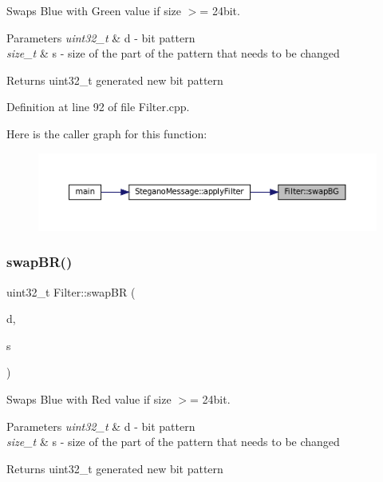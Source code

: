 Swaps Blue with Green value if size $>$= 24bit. 


\begin{DoxyParams}{Parameters}
{\em uint32\+\_\+t} & d -\/ bit pattern \\
\hline
{\em size\+\_\+t} & s -\/ size of the part of the pattern that needs to be changed \\
\hline
\end{DoxyParams}
\begin{DoxyReturn}{Returns}
uint32\+\_\+t generated new bit pattern 
\end{DoxyReturn}


Definition at line 92 of file Filter.\+cpp.

Here is the caller graph for this function\+:
\nopagebreak
\begin{figure}[H]
\begin{center}
\leavevmode
\includegraphics[width=350pt]{classFilter_a68528a62dfbd9f78d6bd0703ca5bd828_icgraph}
\end{center}
\end{figure}
\mbox{\label{classFilter_a51a2b1cce4671083d47530694d0e797e}} 
\subsubsection{\texorpdfstring{swapBR()}{swapBR()}}
{\footnotesize\ttfamily uint32\+\_\+t Filter\+::swap\+BR (\begin{DoxyParamCaption}\item[{uint32\+\_\+t}]{d,  }\item[{size\+\_\+t}]{s }\end{DoxyParamCaption})\hspace{0.3cm}{\ttfamily [static]}}



Swaps Blue with Red value if size $>$= 24bit. 


\begin{DoxyParams}{Parameters}
{\em uint32\+\_\+t} & d -\/ bit pattern \\
\hline
{\em size\+\_\+t} & s -\/ size of the part of the pattern that needs to be changed \\
\hline
\end{DoxyParams}
\begin{DoxyReturn}{Returns}
uint32\+\_\+t generated new bit pattern 
\end{DoxyReturn}


